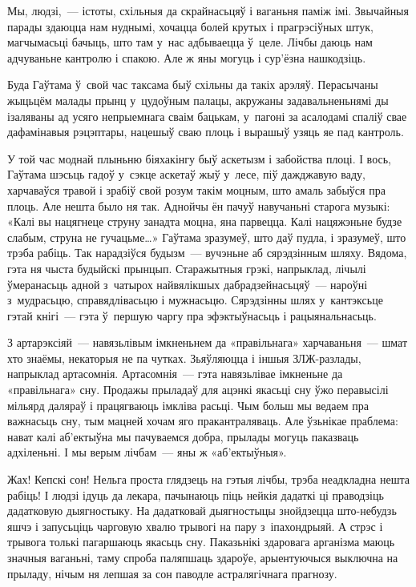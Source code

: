 Мы, людзі,~--- істоты, схільныя да скрайнасьцяў і ваганьня паміж імі. Звычайныя парады здаюцца нам нуднымі, хочацца болей крутых і прагрэсіўных штук, магчымасьці бачыць, што там у~нас адбываецца ў~целе. Лічбы даюць нам адчуваньне кантролю і спакою. Але ж яны могуць і сур'ёзна нашкодзіць.

Буда Гаўтама ў~свой час таксама быў схільны да такіх арэляў. Перасычаны жыцьцём малады прынц у~цудоўным палацы, акружаны задавальненьнямі ды ізаляваны ад усяго непрыемнага сваім бацькам, у~пагоні за асалодамі спаліў свае дафамінавыя рэцэптары, нацешыў сваю плоць і вырашыў узяць яе пад кантроль.

У той час моднай плыньню біяхакінгу быў аскетызм і забойства плоці. І вось, Гаўтама шэсьць гадоў у~сэкце аскетаў жыў у~лесе, піў дажджавую ваду, харчаваўся травой і зрабіў свой розум такім моцным, што амаль забыўся пра плоць. Але нешта было ня так. Аднойчы ён пачуў навучаньні старога музыкі: «Калі вы нацягнеце струну занадта моцна, яна парвецца. Калі нацяжэньне будзе слабым, струна не гучацьме…» Гаўтама зразумеў, што даў пудла, і зразумеў, што трэба рабіць. Так нарадзіўся будызм~--- вучэньне аб сярэдзінным шляху. Вядома, гэта ня чыста будыйскі прынцып. Старажытныя грэкі, напрыклад, лічылі ўмеранасьць адной з~чатырох найвялікшых дабрадзейнасьцяў~--- нароўні з~мудрасьцю, справядлівасьцю і мужнасьцю. Сярэдзінны шлях у~кантэксьце гэтай кнігі~--- гэта ў~першую чаргу пра эфэктыўнасьць і рацыянальнасьць.

З артарэксіяй~--- навязьлівым імкненьнем да «правільнага» харчаваньня~--- шмат хто знаёмы, некаторыя не па чутках. Зьяўляюцца і іншыя ЗЛЖ-разлады, напрыклад артасомнія. Артасомнія~--- гэта навязьлівае імкненьне да «правільнага» сну. Продажы прыладаў для ацэнкі якасьці сну ўжо перавысілі мільярд даляраў і працягваюць імкліва расьці. Чым больш мы ведаем пра важнасьць сну, тым мацней хочам яго пракантраляваць. Але ўзьнікае праблема: нават калі аб'ектыўна мы пачуваемся добра, прылады могуць паказваць адхіленьні. І мы верым лічбам~--- яны ж «аб'ектыўныя».

Жах! Кепскі сон! Нельга проста глядзець на гэтыя лічбы, трэба неадкладна нешта рабіць! І людзі ідуць да лекара, пачынаюць піць нейкія дадаткі ці праводзіць дадатковую дыягностыку. На дадатковай дыягностыцы знойдзецца што-небудзь яшчэ і запусьціць чарговую хвалю трывогі на пару з~іпахондрыяй. А стрэс і трывога толькі пагаршаюць якасьць сну. Паказьнікі здаровага арганізма маюць значныя ваганьні, таму спроба паляпшаць здароўе, арыентуючыся выключна на прыладу, нічым ня лепшая за сон паводле астралягічнага прагнозу.

